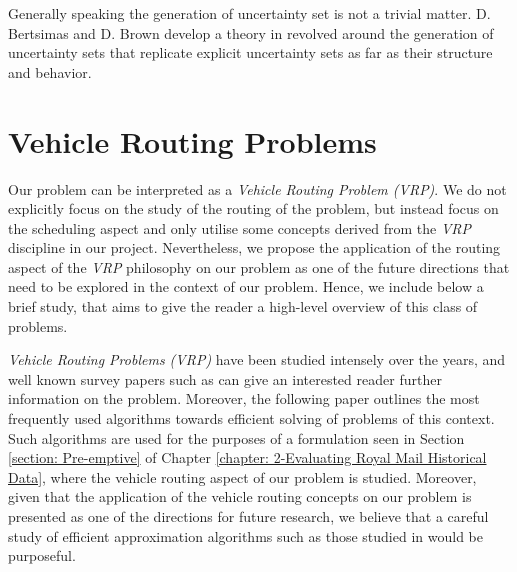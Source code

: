 \vspace{\baselineskip}
\noindent
Generally speaking the generation of uncertainty set is not a trivial matter. D. Bertsimas and D. Brown develop a theory in \cite{concstructuncertaity} revolved around the generation of uncertainty sets that replicate explicit uncertainty sets as far as their structure and behavior. 



\section{Vehicle Routing Problems}
\label{section: vrp}
Our problem can be interpreted as a \textit{Vehicle Routing Problem (VRP)}. We do not explicitly focus on the study of the routing of the problem, but instead focus on the scheduling aspect and only utilise some concepts derived from the \textit{VRP} discipline in our project. Nevertheless, we propose the application of the routing aspect of the \textit{VRP} philosophy on our problem as one of the future directions that need to be explored in the context of our problem. Hence, we include below a brief study, that aims to give the reader a high-level overview of this class of problems.

\vspace{\baselineskip}
\noindent
\textit{Vehicle Routing Problems (VRP)} have been studied intensely over the years, and well known survey papers such as \cite{doi:surveyVRP} can give an interested reader further information on the problem. Moreover, the following paper \cite{LAPORTE1992345} outlines the most frequently used algorithms towards efficient solving of problems of this context. Such algorithms are used for the purposes of a formulation seen in Section \ref{section: Pre-emptive} of Chapter \ref{chapter: 2-Evaluating Royal Mail Historical Data}, where the vehicle routing aspect of our problem is studied. Moreover, given that the application of the vehicle routing concepts on our problem is presented as one of the directions for future research, we believe that a careful study of efficient approximation algorithms such as those studied in \cite{approx} would be purposeful. 




